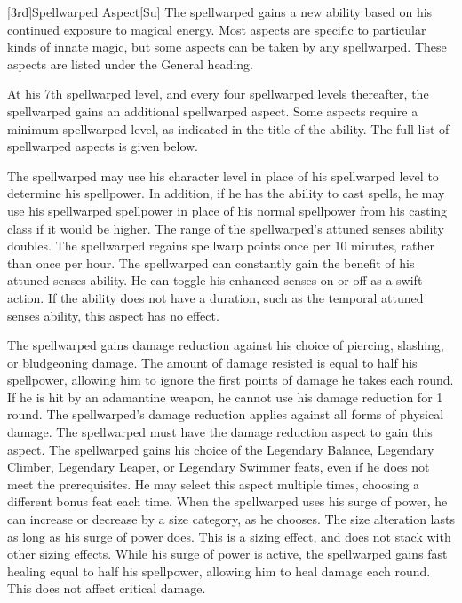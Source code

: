 [3rd]{Spellwarped Aspect}[Su]
The spellwarped gains a new ability based on his continued exposure to magical energy.
Most aspects are specific to particular kinds of innate magic, but some aspects can be taken by any spellwarped.
These aspects are listed under the General heading.

At his 7th spellwarped level, and every four spellwarped levels thereafter, the spellwarped gains an additional spellwarped aspect.
Some aspects require a minimum spellwarped level, as indicated in the title of the ability.
The full list of spellwarped aspects is given below.

The spellwarped may use his character level in place of his spellwarped level to determine his spellpower.
In addition, if he has the ability to cast spells, he may use his spellwarped spellpower in place of his normal spellpower from his casting class if it would be higher.
The range of the spellwarped's attuned senses ability doubles.
The spellwarped regains spellwarp points once per 10 minutes, rather than once per hour.
The spellwarped can constantly gain the benefit of his attuned senses ability.
He can toggle his enhanced senses on or off as a swift action.
If the ability does not have a duration, such as the temporal attuned senses ability, this aspect has no effect.

The spellwarped gains damage reduction against his choice of piercing, slashing, or bludgeoning damage.
The amount of damage resisted is equal to half his spellpower, allowing him to ignore the first points of damage he takes each round.
If he is hit by an adamantine weapon, he cannot use his damage reduction for 1 round.
The spellwarped's damage reduction applies against all forms of physical damage.
The spellwarped must have the damage reduction aspect to gain this aspect.
The spellwarped gains his choice of the Legendary Balance, Legendary Climber, Legendary Leaper, or Legendary Swimmer feats, even if he does not meet the prerequisites.
He may select this aspect multiple times, choosing a different bonus feat each time.
When the spellwarped uses his surge of power, he can increase or decrease by a size category, as he chooses.
The size alteration lasts as long as his surge of power does.
This is a sizing effect, and does not stack with other sizing effects.
While his surge of power is active, the spellwarped gains fast healing equal to half his spellpower, allowing him to heal damage each round.
This does not affect critical damage.

